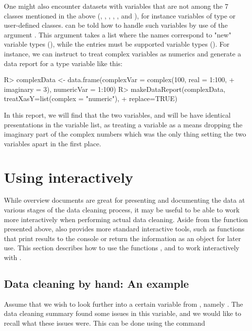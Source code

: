 \documentclass[article,shortnames]{jss}
\begin{document}
One might also encounter datasets with variables that are not among the 7 classes mentioned in the above (, , , , ,  and ), for instance variables of type  or user-defined classes.  can be told how to handle such variables by use of the argument . This argument takes a list where the names correspond to "new" variable types (), while the entries must be supported variable types (). For instance, we can instruct  to treat complex variables as numerics and generate a data report for a type  variable like this:

\begin{Schunk}
\begin{Sinput}
R> complexData <- data.frame(complexVar = complex(100, real = 1:100, 
+    imaginary = 3), numericVar = 1:100)
R> makeDataReport(complexData, treatXasY=list(complex = "numeric"), 
+    replace=TRUE)
\end{Sinput}
\end{Schunk}

In this report, we will find that the two variables,  and  will be have identical presentations in the variable list, as treating a  variable as a  means dropping the imaginary part of the complex numbers which was the only thing setting the two variables apart in the first place.  


\section[Using dataMaid interactively]{Using  interactively}
\label{sec:interactiveCleanR}

While overview documents are great for presenting and documenting the data at various stages 
of the data cleaning process, it may be useful to be able to work more
interactively when performing actual data cleaning. Aside from
the  function presented above,  also
provides more standard  interactive tools, such as
functions that print results to the console or return the information
as an object for later use. This section describes how to use the
functions ,  and  to
work interactively with .

\subsection{Data cleaning by hand: An example}
Assume that we wish to look further into a certain variable from
, namely . The data cleaning summary found some
issues in this variable, and we would like to recall what these issues
were. This can be done using the  command
\end{document}

